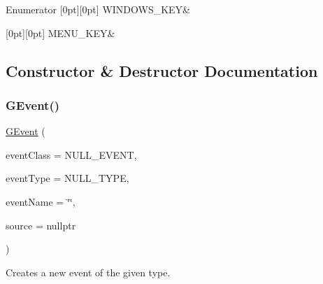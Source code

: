 \begin{DoxyEnumFields}{Enumerator}
[0pt][0pt]{}\mbox{\label{classGEvent_a7885f47644a0388f981f416fa20389b2aaf4f7c51ea158581a9bc455e9a12a649}} 
W\+I\+N\+D\+O\+W\+S\+\_\+\+K\+EY&\\
\hline

[0pt][0pt]{}\mbox{\label{classGEvent_a7885f47644a0388f981f416fa20389b2adf85174536cbc6cb5b6f4a9ae61aaf4c}} 
M\+E\+N\+U\+\_\+\+K\+EY&\\
\hline

\end{DoxyEnumFields}


\subsection{Constructor \& Destructor Documentation}
\mbox{\label{classGEvent_a310475311d619e2b4066a0ee34c1153e}} 
\subsubsection{\texorpdfstring{G\+Event()}{GEvent()}}
{\footnotesize\ttfamily \mbox{\hyperlink{classGEvent}{G\+Event}} (\begin{DoxyParamCaption}\item[{Event\+Class}]{event\+Class = {\ttfamily NULL\+\_\+EVENT},  }\item[{Event\+Type}]{event\+Type = {\ttfamily NULL\+\_\+TYPE},  }\item[{const std\+::string \&}]{event\+Name = {\ttfamily \char`\"{}\char`\"{}},  }\item[{\mbox{\hyperlink{classGObservable}{G\+Observable}} $\ast$}]{source = {\ttfamily nullptr} }\end{DoxyParamCaption})}



Creates a new event of the given type. 

